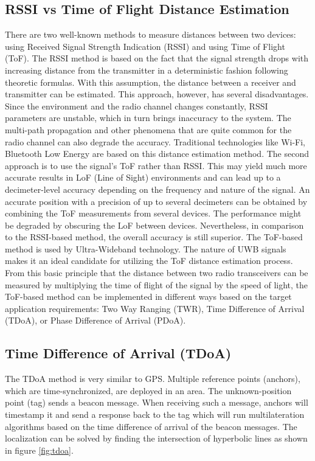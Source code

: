 \documentclass[\main/main.tex]{subfiles}
\begin{document}
\subsection{RSSI vs Time of Flight Distance Estimation}
There are two well-known methods to measure distances between two devices: using Received Signal Strength Indication (RSSI) and using Time of Flight (ToF).
\newline\newline
The RSSI method is based on the fact that the signal strength drops with increasing distance from the transmitter in a deterministic fashion following theoretic formulas. With this assumption, the distance between a receiver and transmitter can be estimated. This approach, however, has several disadvantages. Since the environment and the radio channel changes constantly, RSSI parameters are unstable, which in turn brings inaccuracy to the system. The multi-path propagation and other phenomena that are quite common for the radio channel can also degrade the accuracy. Traditional technologies like Wi-Fi, Bluetooth Low Energy are based on this distance estimation method.
\newline\newline
The second approach is to use the signal’s ToF rather than RSSI. This may yield much more accurate results in LoF (Line of Sight) environments and can lead up to a decimeter-level accuracy depending on the frequency and nature of the signal. An accurate position with a precision of up to several decimeters can be obtained by combining the ToF measurements from several devices. The performance might be degraded by obscuring the LoF between devices. Nevertheless, in comparison to the RSSI-based method, the overall accuracy is still superior. The ToF-based method is used by Ultra-Wideband technology. The nature of UWB signals makes it an ideal candidate for utilizing the ToF distance estimation process. 
\newline\newline
From this basic principle that the distance between two radio transceivers can be measured by multiplying the time of flight of the signal by the speed of light, 
the ToF-based method can be implemented in different ways based on the target application requirements: Two Way Ranging (TWR), Time Difference of Arrival (TDoA), or Phase Difference of Arrival (PDoA).

\subsection{Time Difference of Arrival (TDoA)}
The TDoA method is very similar to GPS. Multiple reference points (anchors), which are time-synchronized, are deployed in an area. The unknown-position point (tag) sends a beacon message. When receiving such a message, anchors will timestamp it and send a response back to the tag which will run multilateration algorithms based on the time difference of arrival of the beacon messages. The localization can be solved by finding the intersection of hyperbolic lines as shown in figure \ref{fig:tdoa}.
\end{document}
